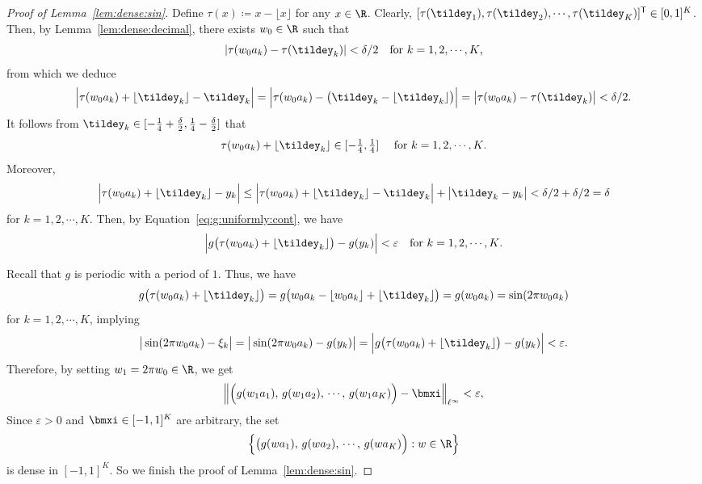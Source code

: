 \documentclass[11pt,a4paper]{article}
\begin{document}
\begin{proof}[Proof of Lemma~\ref{lem:dense:sin}]
Define $\tau(x)\coloneqq  x-\lfloor x\rfloor$ for any $x\in\R$. Clearly, $[\tau(\tildey_1),\tau(\tildey_2),\cdots,\tau(\tildey_K)]^\ts \in [0,1]^K$. Then, by Lemma~\ref{lem:dense:decimal}, there exists $w_0\in\R$ such that
\begin{equation*}
	|\tau(w_0a_k)-\tau(\tildey_k)|<\delta/2\quad \tn{for $k=1,2,\cdots,K$,}
\end{equation*}
from which we deduce
\begin{equation*}
	\Big|\tau(w_0a_k)+\lfloor \tildey_k\rfloor- \tildey_k\Big|=\Big|\tau(w_0a_k)- \big(\tildey_k-\lfloor \tildey_k\rfloor\big)\Big|=\big|\tau(w_0a_k)-\tau(\tildey_k)\big|<\delta/2.
\end{equation*}
It follows from 
 $\tildey_k\in [-\tfrac{1}{4}+\tfrac{\delta}{2},\tfrac{1}{4}-\tfrac{\delta}{2}]$ that
\begin{equation*}
    \tau(w_0a_k)+\lfloor \tildey_k\rfloor\in [-\tfrac{1}{4},\tfrac{1}{4}]\quad \tn{ for $k=1,2,\cdots,K$.}
\end{equation*}
Moreover,
\begin{equation*}
	\Big|\tau(w_0a_k)+\lfloor \tildey_k\rfloor-y_k\Big|\le \Big|\tau(w_0a_k)+\lfloor \tildey_k\rfloor-\tildey_k\Big|+ \big|\tildey_k-y_k\big|<\delta/2+\delta/2=\delta
\end{equation*}
for $k=1,2,\cdots,K$. Then, by Equation~\eqref{eq:g:uniformly:cont}, we have
\begin{equation*}
	\Big| g\big(\tau(w_0a_k)+\lfloor \tildey_k\rfloor\big)-g(y_k) \Big|<\varepsilon\quad \tn{for $k=1,2,\cdots,K$.}
\end{equation*}

Recall that \( g \) is periodic with a period of \( 1 \). Thus, we have
\begin{equation*}
	g\big(\tau(w_0a_k)+\lfloor \tildey_k\rfloor\big)=g\big(w_0a_k-\lfloor w_0 a_k\rfloor+\lfloor \tildey_k\rfloor\big)=g(w_0a_k)=\sin(2\pi  w_0a_k)
\end{equation*}
for $k=1,2,\cdots,K$, implying
\begin{equation*}
	\begin{split}
		\big|\sin(2\pi    w_0a_k)- \xi_k\big|
  =\big|\sin(2\pi    w_0a_k)- g(y_k) \big|
  =\Big| g\big(\tau(w_0a_k)+\lfloor \tildey_k\rfloor\big)-g(y_k) \Big|<\varepsilon.
	\end{split}
\end{equation*}
Therefore, by setting $w_1=2\pi w_0\in\R$, we get 
\begin{equation*}
	\Big\| \Big(g(w_1a_1),\, g(w_1a_2),\, \cdots,\, g(w_1a_K)\Big)  -\bmxi    \Big\|_{\ell^\infty}<\varepsilon,
\end{equation*}
Since $\varepsilon>0$ and $\bmxi\in [-1,1]^K$ are arbitrary, the set
\begin{equation*}
	\Big\{\big(g(wa_1),\, g(wa_2),\, \cdots,\,g(wa_K)\Big) : w\in\R
	\Big\}
\end{equation*}
is dense in $[-1,1]^K$. So we finish the proof of Lemma~\ref{lem:dense:sin}.
\end{proof}
\end{document}
